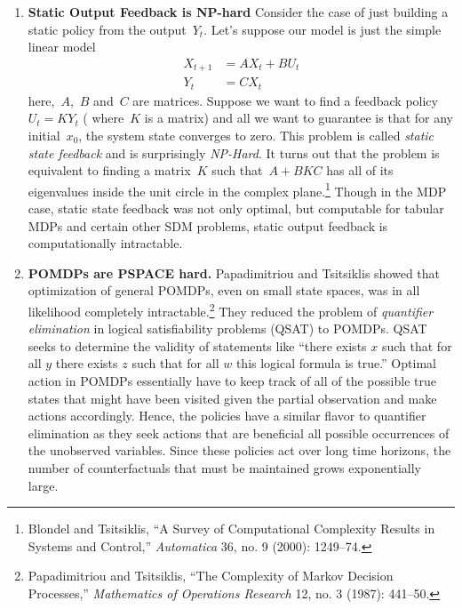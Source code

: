 \documentclass{tufte-book}
\begin{document}
\begin{enumerate}
\def\labelenumi{\arabic{enumi}.}
\item
  \textbf{Static Output Feedback is NP-hard} Consider the case of just
  building a static policy from the output~\(Y_t\). Let's suppose our
  model is just the simple linear model \[
  \begin{aligned}
   X_{t+1} &= A X_t + B U_t\\
   Y_t &= C X_t
  \end{aligned}
  \] here,~\(A\),~\(B\) and~\(C\) are matrices. Suppose we want to find
  a feedback policy~\(U_t = K Y_t\) ( where~\(K\) is a matrix) and all
  we want to guarantee is that for any initial~\(x_0\), the system state
  converges to zero. This problem is called \emph{static state feedback}
  and is surprisingly \emph{NP-Hard}. It turns out that the problem is
  equivalent to finding a matrix~\(K\) such that~\(A+BKC\) has all of
  its eigenvalues inside the unit circle in the complex
  plane.\footnote{Blondel and Tsitsiklis, {``A Survey of Computational
    Complexity Results in Systems and Control,''} \emph{Automatica} 36,
    no. 9 (2000): 1249--74.} Though in the MDP case, static state
  feedback was not only optimal, but computable for tabular MDPs and
  certain other SDM problems, static output feedback is computationally
  intractable.
\item
  \textbf{POMDPs are PSPACE hard.} Papadimitriou and Tsitsiklis showed
  that optimization of general POMDPs, even on small state spaces, was
  in all likelihood completely intractable.\footnote{Papadimitriou and
    Tsitsiklis, {``The Complexity of {M}arkov {D}ecision {P}rocesses,''}
    \emph{Mathematics of Operations Research} 12, no. 3 (1987): 441--50.}
  They reduced the problem of \emph{quantifier elimination} in logical
  satisfiability problems (QSAT) to POMDPs. QSAT seeks to determine the
  validity of statements like ``there exists \(x\) such that for all
  \(y\) there exists \(z\) such that for all \(w\) this logical formula
  is true.'' Optimal action in POMDPs essentially have to keep track of
  all of the possible true states that might have been visited given the
  partial observation and make actions accordingly. Hence, the policies
  have a similar flavor to quantifier elimination as they seek actions
  that are beneficial all possible occurrences of the unobserved
  variables. Since these policies act over long time horizons, the
  number of counterfactuals that must be maintained grows exponentially
  large.
\end{enumerate}
\end{document}
